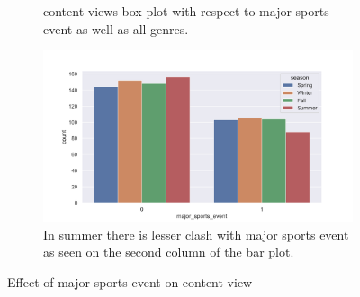 \documentclass[12pt,a4paper]{style}
\begin{document}
\begin{figure}[h]
\begin{subfigure}[t]{0.49\textwidth}
		\caption{content views box plot with respect to major sports event as well as all genres.}
		\label{fig:views_count_sports_event_genre.png}
	\end{subfigure}
		\hfill
	\begin{subfigure}[t]{0.49\textwidth}
		\includegraphics[width=\textwidth]{sports_vs_season.png}
		\caption{In summer there is lesser clash with major sports event as seen on the second column of the bar plot.}
		\label{fig:sports_vs_season}
	\end{subfigure}
	\caption{Effect of major sports event on content view}
	\label{fig:Effect of major sports event on content view}
\end{figure}
\end{document}
